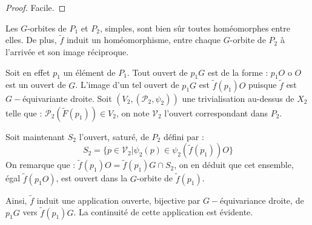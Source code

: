 \begin{proof}
Facile.
\end{proof}

\begin{rema}%
Les $G$-orbites de $P_1$ et $P_2$, simples, sont bien sûr toutes hom\'eomorphes entre elles. %
De plus, $\tilde{f}$ induit un hom\'eomorphisme, entre chaque $G$-orbite de $P_2$ à l'arrivée et son image réciproque.
\par
Soit en effet $p_1$ un élément de $P_1$. Tout ouvert de $p_1G$ est de la forme : $p_1O$ o $O$ est un ouvert de $G$. %
L'image d'un tel ouvert de $p_1G$ est $\tilde{f}(p_1)O$ puisque $\tilde{f}$ est $G-$\'equivariante  droite.
Soit $(V_2,(\mathcal{P}_2,\psi_2))$ une trivialisation au-dessus de $X_2$ telle que : $\mathcal{P}_2(\tilde{F}(p_1)) \in V_2$, %
on note $\mathcal{V}_2$ l'ouvert correspondant dans $P_2$. %
\par
Soit maintenant $S_2$ l'ouvert, satur\'e, de $P_2$ d\'efini par :
\[S_2=\{p \in \mathcal{V}_2 | \psi_2(p) \in \psi_2(\tilde{f}(p_1))O\}\]
On remarque que : $\tilde{f}(p_1) O = \tilde{f}(p_1) G \cap S_2$, on en d\'eduit que cet ensemble, \'egal  $\tilde{f}(p_1O)$, est ouvert dans la $G$-orbite de $\tilde{f}(p_1)$.
\par
Ainsi, $\tilde{f}$ induit une application ouverte, bijective par $G-$\'equivariance  droite, de $p_1G$ vers $\tilde{f}(p_1)G$. La continuit\'e de cette application est \'evidente.
\end{rema}

